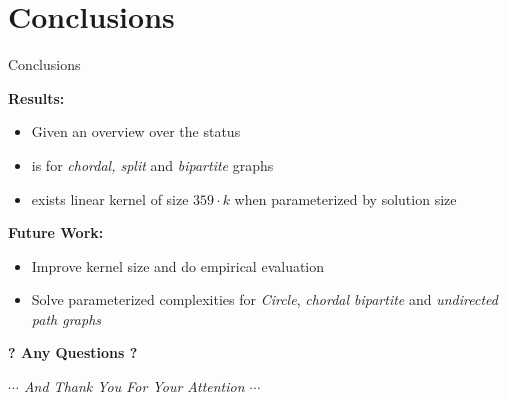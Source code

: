 \section{Conclusions}
\begin{frame}{Conclusions}

    \textbf{Results: }
    \begin{itemize}
        \pause \item Given an overview over the status
        \pause \item \sdom is \WONEhs for \textit{chordal, split} and \textit{bipartite} graphs
        \pause \item exists linear kernel of size $359 \cdot k$ when parameterized by solution size
    \end{itemize}


    \textbf{Future Work: }
    \begin{itemize}
        \pause \item Improve kernel size and do empirical evaluation
        \pause \item Solve parameterized complexities for \textit{Circle}, \textit{chordal bipartite} and \textit{undirected path graphs}  
    \end{itemize}
\end{frame}


\begin{frame}[c]{}
    \begin{center}
        \LARGE
        \textbf{? Any Questions ?}

        \small
        \textit{$\cdots$ And Thank You For Your Attention $\cdots$}
    \end{center}
\end{frame}